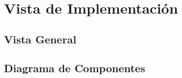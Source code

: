\section{Vista de Implementación} \label{vistaImplementacion}
    \subsection{Vista General}
    \subsection{Diagrama de Componentes}